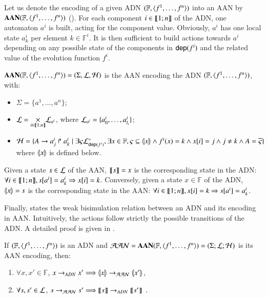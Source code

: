Let us denote the encoding of a given ADN $\DNdef$ into an AAN by $\toPH\DNdef$ ().
For each component $i\in\segm{1}{n}$ of the ADN,
one automaton $a^i$ is built, acting for the component value.
Obviously, $a^i$ has one local state $a^i_k$ per element $k \in \mathbb F^i$.
It is then sufficient to build actions towards $a^i$
depending on any possible state of the components in $\DNdep(f^i)$
and the related value of the evolution function $f^i$.

\begin{definition}
\label{def:DN2PH}
  $\toPH\DNdef=(\Sigma,\PHl,\Hits)$ is the AAN encoding the ADN $\DNdef$, with:
  \begin{itemize}
    \item $\Sigma = \{ a^1, \dots, a^n \}$;
    
    \item $\PHl=\underset{i\in\segm{1}{n}}{\times} \PHl_{a^i}$, where
      $\PHl_{a^i}=\{a^i_0, \dots, a^i_{l_i}\}$;
    
    \item $\PHh = \{ \PHfrappe{A}{a^i_j}{a^i_k} \mid
      \exists \varsigma \PHsubl[\PHl]_{\DNdep(f^i)}, \exists x \in \mathbb{F},
      \varsigma \subseteq \encode{x} \wedge
      f^i(x) = k \wedge \PHget{x}{i} = j \wedge j \neq k \wedge
      A = \toset{\varsigma} \}$ where $\encode{x}$ is defined below.
  \end{itemize}
  Given a state $s \in \PHl$ of the AAN,
  $\decode s=x$ is the corresponding state in the ADN:
  $\forall i\in\segm{1}{n}, \get{s}{a^i}=a^i_k \Rightarrow \get{x}{i}=k$.
  Conversely, given a state $x\in \mathbb F$ of the ADN, 
  $\encode x=s$ is the corresponding state in the AAN:
  $\forall i\in\segm{1}{n}, \get{x}{i}=k \Rightarrow \get{s}{a^i}=a^i_k$.
\end{definition}

Finally,
 states the weak bisimulation relation between an ADN and its encoding in AAN.
Intuitively, the actions follow strictly the possible transitions of the ADN.
A detailed proof is given in . 

\begin{theorem}[$\DNdef \approx \toPH\DNdef$]
\label{th:bisimDN}
  If $\DNdef$ is an ADN
  and $\PH = \toPH\DNdef = (\PHs; \PHl; \PHa)$ is its AAN encoding, then:
  \begin{enumerate}
    \item \label{adn2ph} $\forall x,x'\in\mathbb F$,
      $x\DNtrans x' \Longrightarrow \encode x \PHPtrans \encode{x'}$,
    \item \label{ph2adn} $\forall s,s'\in \PHl$,
      $s\PHPtrans s' \Longrightarrow \decode s \DNtrans
      \decode{s'}\enspace.$
  \end{enumerate}
\end{theorem}
